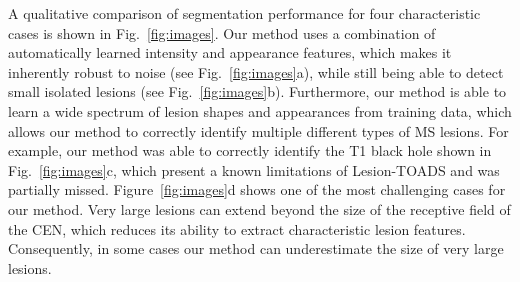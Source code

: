 A qualitative comparison of segmentation performance for four characteristic
cases is shown in Fig.~\ref{fig:images}. Our method uses a combination of
automatically learned intensity and appearance features, which makes it
inherently robust to noise (see Fig.~\ref{fig:images}a), while still being able
to detect small isolated lesions (see Fig.~\ref{fig:images}b). Furthermore, our
method is able to learn a wide spectrum of lesion shapes and appearances from
training data, which allows our method to correctly identify multiple different
types of MS lesions. For example, our method was able to correctly identify the
T1 black hole shown in Fig.~\ref{fig:images}c, which present a known limitations
of Lesion-TOADS \citep{shiee2010} and was partially missed.
Figure~\ref{fig:images}d shows one of the most challenging cases for our method.
Very large lesions can extend beyond the size of the receptive field of the CEN,
which reduces its ability to extract characteristic lesion features.
Consequently, in some cases our method can underestimate the size of very large
lesions.

